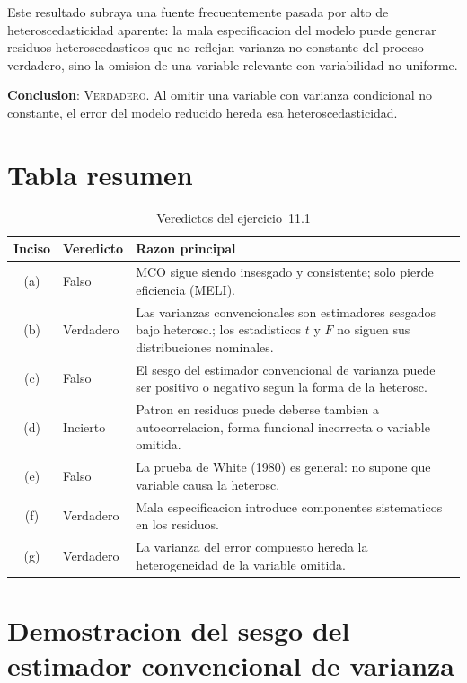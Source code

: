 \documentclass[12pt, letterpaper]{article}
\theoremstyle{remark}
\begin{document}
Este resultado subraya una fuente frecuentemente pasada por alto de
heteroscedasticidad aparente: la mala especificacion del modelo puede
generar residuos heteroscedasticos que no reflejan varianza no constante
del proceso verdadero, sino la omision de una variable relevante con
variabilidad no uniforme.

\textbf{Conclusion}: \textsc{Verdadero}. Al omitir una variable con varianza
condicional no constante, el error del modelo reducido hereda esa
heteroscedasticidad.

\bigskip

\section{Tabla resumen}

\begin{table}[ht]
\centering
\caption{Veredictos del ejercicio~11.1}
\label{tab:resumen}
\small
\begin{tabular}{clp{9cm}}
\toprule
\textbf{Inciso} & \textbf{Veredicto} & \textbf{Razon principal} \\
\midrule
(a) & Falso
  & MCO sigue siendo insesgado y consistente; solo pierde eficiencia (MELI). \\[4pt]
(b) & Verdadero
  & Las varianzas convencionales son estimadores sesgados bajo heterosc.; los estadisticos $t$ y $F$ no siguen sus distribuciones nominales. \\[4pt]
(c) & Falso
  & El sesgo del estimador convencional de varianza puede ser positivo o negativo segun la forma de la heterosc. \\[4pt]
(d) & Incierto
  & Patron en residuos puede deberse tambien a autocorrelacion, forma funcional incorrecta o variable omitida. \\[4pt]
(e) & Falso
  & La prueba de White (1980) es general: no supone que variable causa la heterosc. \\[4pt]
(f) & Verdadero
  & Mala especificacion introduce componentes sistematicos en los residuos. \\[4pt]
(g) & Verdadero
  & La varianza del error compuesto hereda la heterogeneidad de la variable omitida. \\
\bottomrule
\end{tabular}
\end{table}

\appendix

\section{Demostracion del sesgo del estimador convencional de varianza}
\end{document}
